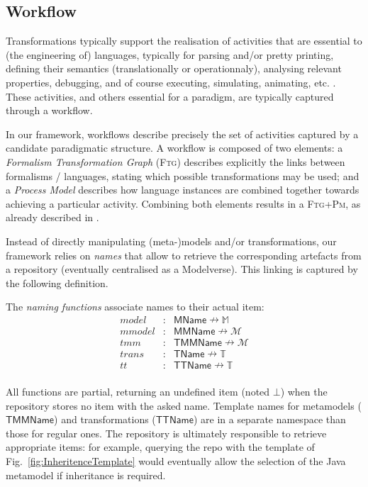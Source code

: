 \subsection{Workflow}
\label{sec:Workflow}

Transformations typically support the realisation of activities that are
essential to (the engineering of) languages, typically for parsing and/or pretty
printing, defining their semantics (translationally or operationnaly), analysing
relevant properties, debugging, and of course executing, simulating, animating,
etc. \cite{J:Lucio-Amrani-etAl:2014}.
These activities, and others essential for a paradigm, are typically captured
through a workflow.

In our framework, workflows describe precisely the set of activities captured by
a candidate paradigmatic structure. A workflow is composed of two elements:
a \emph{Formalism Transformation Graph} (\textsc{Ftg}) describes explicitly the
links between formalisms / languages, stating which possible transformations may
be used; and a \emph{Process Model} describes how language instances are
combined together towards achieving a particular activity.
Combining both elements results in a \textsc{Ftg+Pm}, as already described in
\cite{Mustafiz-etAl:2012,Lucio-Mustafiz-etAl:2013,TR:Lucio-Mustafiz-etAl:2012}.

Instead of directly manipulating (meta-)models and/or transformations, our 
framework relies on \emph{names} that allow to retrieve the corresponding 
artefacts from a repository (eventually centralised as a Modelverse). This 
linking is captured by the following definition.

\begin{Definition}
   The \emph{naming functions} associate names to their actual item:
   \begin{displaymath}
      \begin{array}{rcl}
         model  &\colon& \mathsf{MName} \nrightarrow \mathbb{M}\\
         mmodel &\colon& \mathsf{MMName} \nrightarrow \mathcal{M}\\
         tmm    &\colon& \mathsf{TMMName} \nrightarrow \mathcal{M}\\
         trans  &\colon& \mathsf{TName} \nrightarrow \mathbb{T}\\
         tt     &\colon& \mathsf{TTName} \nrightarrow \mathbb{T}\\
      \end{array}
   \end{displaymath}
\end{Definition}
\noindent
All functions are partial, returning an undefined item (noted $\bot$) when the 
repository stores no item with the asked name. 
Template names for metamodels 
($\mathsf{TMMName}$) and transformations ($\mathsf{TTName}$) are in a separate 
namespace than those for regular ones. 
The repository is ultimately responsible 
to retrieve appropriate items: for example, querying the repo with the template 
of Fig.~\ref{fig:InheritenceTemplate} would eventually allow the selection of 
the Java metamodel if inheritance is required.

